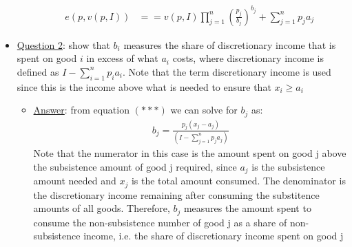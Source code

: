 \documentclass{article}
\begin{document}
\begin{itemize}
\begin{itemize}
\begin{align*}
      e(p,v(p,I)) &= =v(p,I) \prod_{j=1}^{n} (\frac{p_{j}}{b_{j}})^{b_{j}} + \sum_{j=1}^{n}p_{j}a_{j} \ \tag{$\star \star$}
    \end{align*}
  \end{itemize}
  \item  \underline{Question 2}: show that $b_{i}$ measures the share of discretionary income that is spent on good $i$ in excess of what $a_{i}$ costs, where discretionary income is defined as $I - \sum_{i=1}^{n}p_{i}a_{i}$. Note that the term discretionary income is used since this is the income above what is needed to ensure that $x_{i} \geq a_{i}$
  \begin{itemize}
    \item  \underline{Answer}: from equation $(***)$ we can solve for $b_{j}$ as:
    \begin{gather*}
      b_{j} = \frac{p_{j}(x_{j}-a_{j})}{(I - \sum_{j=1}^{n}p_{j}a_{j})}
    \end{gather*}
    Note that the numerator in this case is the amount spent on good j above the subsistence amount of good j required, since $a_{j}$ is the subsistence amount needed and $x_{j}$ is the total amount consumed. The denominator is the discretionary income remaining after consuming the substitence amounts of all goods. Therefore, $b_{j}$ measures the amount spent to consume the non-subsistence number of good j as a share of non-subsistence income, i.e. the share of discretionary income spent on good j
  \end{itemize}
\end{itemize}
\par
\vspace{6mm}
\end{document}
